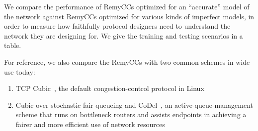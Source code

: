 We compare the performance of RemyCCs optimized for an ``accurate''
model of the network against RemyCCs optimized for various
kinds of imperfect models, in order to measure how faithfully protocol
designers need to understand the network they are designing for. We
give the training and testing scenarios in a table.

For reference, we also compare the RemyCCs with two common schemes in wide use today:

\begin{enumerate}
\item TCP Cubic~\cite{cubic}, the default congestion-control protocol in Linux
\item Cubic over stochastic fair queueing and CoDel~\cite{CoDel}, an
  active-queue-management scheme that runs on bottleneck routers and
  assists endpoints in achieving a fairer and more efficient use of
  network resources
\end{enumerate}

